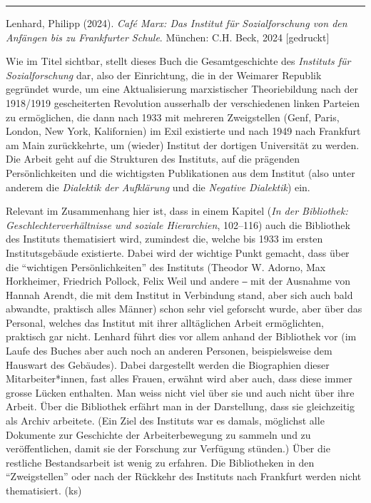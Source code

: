 \documentclass[a4paper,
fontsize=11pt,
oneside,
numbers=noperiodatend,
parskip=half-,
bibliography=totoc,
final
]{scrartcl}
\begin{document}
\begin{center}\rule{0.5\linewidth}{0.5pt}\end{center}

Lenhard, Philipp (2024). \emph{Café Marx: Das Institut für
Sozialforschung von den Anfängen bis zu Frankfurter Schule}. München:
C.H. Beck, 2024 {[}gedruckt{]}

Wie im Titel sichtbar, stellt dieses Buch die Gesamtgeschichte des
\emph{Instituts für Sozialforschung} dar, also der Einrichtung, die in
der Weimarer Republik gegründet wurde, um eine Aktualisierung
marxistischer Theoriebildung nach der 1918/1919 gescheiterten Revolution
ausserhalb der verschiedenen linken Parteien zu ermöglichen, die dann
nach 1933 mit mehreren Zweigstellen (Genf, Paris, London, New York,
Kalifornien) im Exil existierte und nach 1949 nach Frankfurt am Main
zurückkehrte, um (wieder) Institut der dortigen Universität zu werden.
Die Arbeit geht auf die Strukturen des Instituts, auf die prägenden
Persönlichkeiten und die wichtigsten Publikationen aus dem Institut
(also unter anderem die \emph{Dialektik der Aufklärung} und die
\emph{Negative Dialektik}) ein.

Relevant im Zusammenhang hier ist, dass in einem Kapitel (\emph{In der
Bibliothek: Geschlechterverhältnisse und soziale Hierarchien}, 102--116)
auch die Bibliothek des Instituts thematisiert wird, zumindest die,
welche bis 1933 im ersten Institutsgebäude existierte. Dabei wird der
wichtige Punkt gemacht, dass über die \enquote{wichtigen
Persönlichkeiten} des Instituts (Theodor W. Adorno, Max Horkheimer,
Friedrich Pollock, Felix Weil und andere ‒ mit der Ausnahme von Hannah
Arendt, die mit dem Institut in Verbindung stand, aber sich auch bald
abwandte, praktisch alles Männer) schon sehr viel geforscht wurde, aber
über das Personal, welches das Institut mit ihrer alltäglichen Arbeit
ermöglichten, praktisch gar nicht. Lenhard führt dies vor allem anhand
der Bibliothek vor (im Laufe des Buches aber auch noch an anderen
Personen, beispielsweise dem Hauswart des Gebäudes). Dabei dargestellt
werden die Biographien dieser Mitarbeiter*innen, fast alles Frauen,
erwähnt wird aber auch, dass diese immer grosse Lücken enthalten. Man
weiss nicht viel über sie und auch nicht über ihre Arbeit. Über die
Bibliothek erfährt man in der Darstellung, dass sie gleichzeitig als
Archiv arbeitete. (Ein Ziel des Instituts war es damals, möglichst alle
Dokumente zur Geschichte der Arbeiterbewegung zu sammeln und zu
veröffentlichen, damit sie der Forschung zur Verfügung stünden.) Über
die restliche Bestandsarbeit ist wenig zu erfahren. Die Bibliotheken in
den \enquote{Zweigstellen} oder nach der Rückkehr des Instituts nach
Frankfurt werden nicht thematisiert. (ks)
\end{document}
